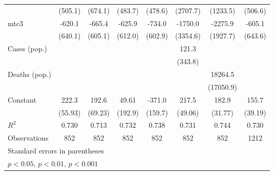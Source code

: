 \documentclass{article}
\begin{document}
{\begin{longtable}{l*{7}{c}}
                &  (505.1)         &  (674.1)         &  (483.7)         &  (478.6)         & (2707.7)         & (1233.5)         &  (506.6)         \\
mtc3            &   -620.1         &   -665.4         &   -625.9         &   -734.0         &  -1750.0         &  -2275.9         &   -605.1         \\
                &  (640.1)         &  (605.1)         &  (612.0)         &  (602.9)         & (3354.6)         & (1927.7)         &  (643.6)         \\
Cases (pop.)    &                  &                  &                  &                  &    121.3         &                  &                  \\
                &                  &                  &                  &                  &  (343.8)         &                  &                  \\
Deaths (pop.)   &                  &                  &                  &                  &                  &  18264.5         &                  \\
                &                  &                  &                  &                  &                  &(17050.9)         &                  \\
Constant        &    222.3\sym{*}  &    192.6\sym{*}  &    49.61         &   -371.0         &    217.5\sym{**} &    182.9\sym{**} &    155.7\sym{*}  \\
                &  (55.93)         &  (69.23)         &  (192.9)         &  (159.7)         &  (49.06)         &  (31.77)         &  (39.19)         \\
\hline
\(R^{2}\)       &    0.730         &    0.713         &    0.732         &    0.738         &    0.731         &    0.744         &    0.730         \\
Observations    &      852         &      852         &      852         &      852         &      852         &      852         &     1212         \\
\hline\hline
\multicolumn{8}{l}{\footnotesize Standard errors in parentheses}\\
\multicolumn{8}{l}{\footnotesize \sym{*} \(p<0.05\), \sym{**} \(p<0.01\), \sym{***} \(p<0.001\)}\\
\end{longtable}
}
\end{document}
